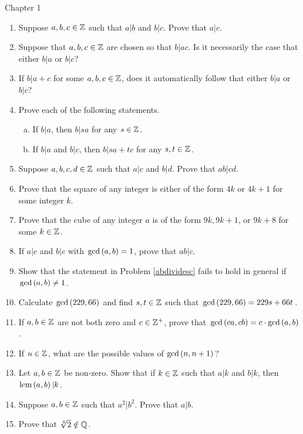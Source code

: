 \documentclass[11pt,fleqn,dvipsnames,usenames]{article}
\renewcommand{\headrulewidth}{1pt}
\begin{document}
\fancyhead[L]{\course}
\fancyhead[R]{\term}
\renewcommand{\headrulewidth}{0.4pt}

{\huge Chapter 1}
\vsp

\begin{enumerate}
\item Suppose $a,b,c\in\mathbb{Z}$ such that $a|b$ and $b|c$.  Prove that $a|c$.
\item Suppose that $a,b,c\in\mathbb{Z}$ are chosen so that $b|ac$.  Is it necessarily the case that either $b|a$ or $b|c$?
\item If $b|a+c$ for some $a,b,c\in \mathbb{Z}$, does it automatically follow that either $b|a$ or $b|c$?
\item Prove each of the following statements.
\begin{enumerate}[(a)]
\item If $b|a$, then $b|sa$ for any $s\in\mathbb{Z}$.
\item If $b|a$ and $b|c$, then $b|sa+tc$ for any $s,t\in\mathbb{Z}$.
\end{enumerate}
\item Suppose $a,b,c,d\in\mathbb{Z}$ such that $a|c$ and $b|d$.  Prove that $ab|cd$.
\item Prove that the square of any integer is either of the form $4k$ or $4k+1$ for some integer $k$.
\item Prove that the cube of any integer $a$ is of the form $9k, 9k+1$, or $9k+8$ for some $k\in\mathbb{Z}$.
\item If $a|c$ and $b|c$ with $\text{gcd}\left(a,b\right) = 1$, prove that $ab|c$.\label{abdividesc}
\item Show that the statement in Problem \ref{abdividesc} fails to hold in general if $\text{gcd}\left(a,b\right)\neq 1$.
\item Calculate $\text{gcd}\left(229,66\right)$ and find $s,t\in\mathbb{Z}$ such that $\text{gcd}\left(229,66\right) = 229s + 66t$.
\item If $a,b\in\mathbb{Z}$ are not both zero and $c\in\mathbb{Z}^{+}$, prove that $\text{gcd}\left(ca,cb\right) = c\cdot \text{gcd}\left(a,b\right)$.
\item If $n\in \mathbb{Z}$, what are the possible values of $\text{gcd}\left(n, n+1\right)$?
\item Let $a,b\in\mathbb{Z}$ be non-zero.  Show that if $k\in\mathbb{Z}$ such that $a|k$ and $b|k$, then $\text{lcm}\left(a, b\right)|k$.
\item Suppose $a,b\in\mathbb{Z}$ such that $a^2|b^2$.  Prove that $a|b$.
\item Prove that $\sqrt[3]{2}\notin\mathbb{Q}$.
\end{enumerate}
\vsp
\end{document}
